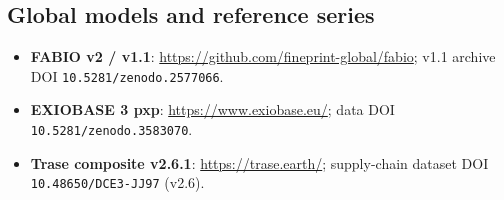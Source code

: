 \subsection*{Global models and reference series}
\begin{itemize}
  \item \textbf{FABIO v2 / v1.1}:
    \url{https://github.com/fineprint-global/fabio}; v1.1 archive DOI
    \texttt{10.5281/zenodo.2577066}.
  \item \textbf{EXIOBASE 3 pxp}: \url{https://www.exiobase.eu/};
    data DOI \texttt{10.5281/zenodo.3583070}.
  \item \textbf{Trase composite v2.6.1}: \url{https://trase.earth/};
    supply-chain dataset DOI \texttt{10.48650/DCE3-JJ97} (v2.6).
\end{itemize}

